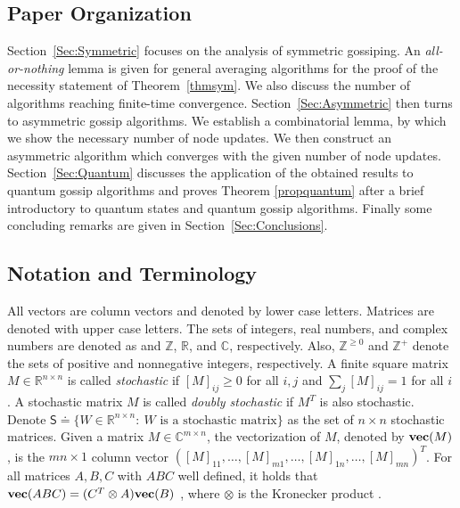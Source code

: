 \documentclass[a4paper, 11pt]{article}
\begin{document}
\subsection{Paper Organization}
 Section~\ref{Sec:Symmetric} focuses on the analysis of symmetric gossiping. An {\em all-or-nothing} lemma is given  for general averaging algorithms for the proof of the necessity statement of Theorem~\ref{thmsym}. We also discuss the number of algorithms  reaching finite-time convergence. Section~\ref{Sec:Asymmetric} then turns to asymmetric gossip algorithms. We establish a combinatorial lemma, by which we show the necessary number of node updates. We then construct an asymmetric algorithm which converges with the given number of node updates. Section~\ref{Sec:Quantum} discusses the application of the obtained results to  quantum gossip algorithms and proves Theorem \ref{propquantum} after a brief introductory to quantum states and quantum gossip algorithms.   Finally some concluding remarks are given in Section~\ref{Sec:Conclusions}.

{
\subsection*{Notation and Terminology}
All vectors are column vectors and denoted by lower case letters. Matrices are denoted
with upper case letters. The sets of  integers, real numbers,  and complex numbers are denoted as and $\mathbb{Z}$, $\mathbb{R}$, and  $\mathbb{C}$,  respectively. Also, $\mathbb{Z}^{\geq0}$ and $\mathbb{Z}^+$ denote the sets of positive and nonnegative integers, respectively.    A finite square matrix $M\in\mathbb{R}^{n\times n}$ is called {\em stochastic} if $[M]_{ij}\geq 0$ for all $i,j$ and $\sum_j [M]_{ij}=1$ for all $i$ \cite{Latouche1999}.  A stochastic matrix $M$ is called {\em doubly stochastic} if $M^T$ is also  stochastic. Denote  $\mathsf{S}\doteq\big\{W\in\mathbb{R}^{n\times n}: \ W \mbox{ is a stochastic matrix} \big\}$ as the set of $n\times n$ stochastic matrices. Given a matrix $M\in \mathbb{C}^{m\times n}$, the vectorization of $M$, denoted by ${\rm \bf vec}(M)$, is the $mn\times 1$ column vector  $([M]_{11}, \dots,  [M]_{m1},   \dots, [M]_{1n},\dots, [M]_{mn})^T$. For all  matrices $A,B,C$ with $ABC$ well defined, it holds that ${\rm \bf vec}(ABC)=(C^T\otimes A){\rm \bf vec}(B)$ , where $\otimes$ {is} the Kronecker product \cite{Horn}.
}
\end{document}
